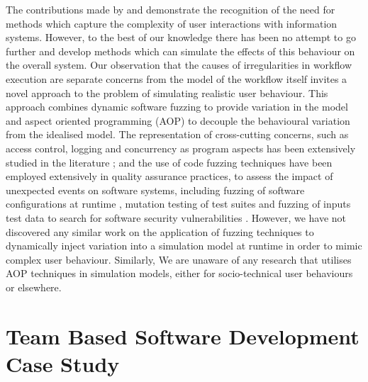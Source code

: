 \documentclass{llncs}
\begin{document}
The contributions made by \citet{herrmann1999vagueness} and \citet{sommerville09deriving} demonstrate the recognition of
the need for methods which capture the complexity of user interactions with information systems.  However, to the best
of our knowledge there has been no attempt to go further and develop methods which can simulate the effects of this
behaviour on the overall system. Our observation that the causes of irregularities in workflow execution are separate
concerns from the model of the workflow itself invites a novel approach to the problem of simulating realistic user
behaviour. This approach combines dynamic software fuzzing to provide variation in the model and aspect oriented
programming (AOP) to decouple the behavioural variation from the idealised model. The representation of cross-cutting
concerns, such as access control, logging and concurrency as program aspects has been extensively studied in the
literature \citep{Ali2012Aspect}; and the use of code fuzzing techniques have been employed extensively in quality
assurance practices, to assess the impact of unexpected events on software systems, including fuzzing of software
configurations at runtime \citep{config_fuzzing}, mutation testing of test suites \cite{demillo78hints} and fuzzing of
inputs test data to search for software security vulnerabilities \citep{takanen08fuzzing}.  However, we have not
discovered any similar work on the application of fuzzing techniques to dynamically inject variation into a simulation
model at runtime in order to mimic complex user behaviour. Similarly, We are unaware of any research that utilises AOP
techniques in simulation models, either for socio-technical user behaviours or elsewhere.


\section{Team Based Software Development Case Study}
\label{sec:case-study}

\end{document}
